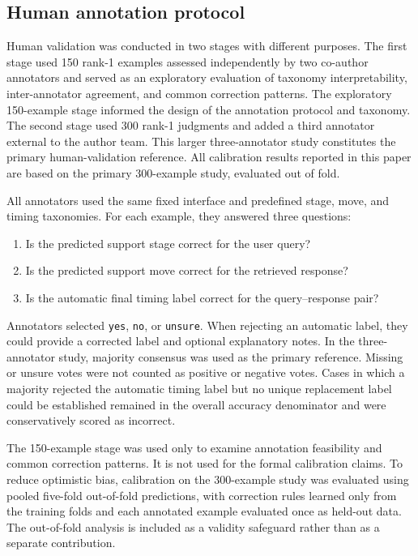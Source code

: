 \documentclass[preprint,12pt,a4paper]{elsarticle}
\begin{document}
\subsection{Human annotation protocol}

Human validation was conducted in two stages with different purposes. The first stage used 150 rank-1 examples assessed independently by two co-author annotators and served as an exploratory evaluation of taxonomy interpretability, inter-annotator agreement, and common correction patterns. The exploratory 150-example stage informed the design of the annotation protocol and taxonomy. The second stage used 300 rank-1 judgments and added a third annotator external to the author team. This larger three-annotator study constitutes the primary human-validation reference. All calibration results reported in this paper are based on the primary 300-example study, evaluated out of fold.

All annotators used the same fixed interface and predefined stage, move, and timing taxonomies. For each example, they answered three questions:

\begin{enumerate}
    \item Is the predicted support stage correct for the user query?
    \item Is the predicted support move correct for the retrieved response?
    \item Is the automatic final timing label correct for the query--response pair?
\end{enumerate}

Annotators selected \texttt{yes}, \texttt{no}, or \texttt{unsure}. When rejecting an automatic label, they could provide a corrected label and optional explanatory notes. In the three-annotator study, majority consensus was used as the primary reference. Missing or unsure votes were not counted as positive or negative votes. Cases in which a majority rejected the automatic timing label but no unique replacement label could be established remained in the overall accuracy denominator and were conservatively scored as incorrect.

The 150-example stage was used only to examine annotation feasibility and common correction patterns. It is not used for the formal calibration claims. To reduce optimistic bias, calibration on the 300-example study was evaluated using pooled five-fold out-of-fold predictions, with correction rules learned only from the training folds and each annotated example evaluated once as held-out data. The out-of-fold analysis is included as a validity safeguard rather than as a separate contribution.
\end{document}

